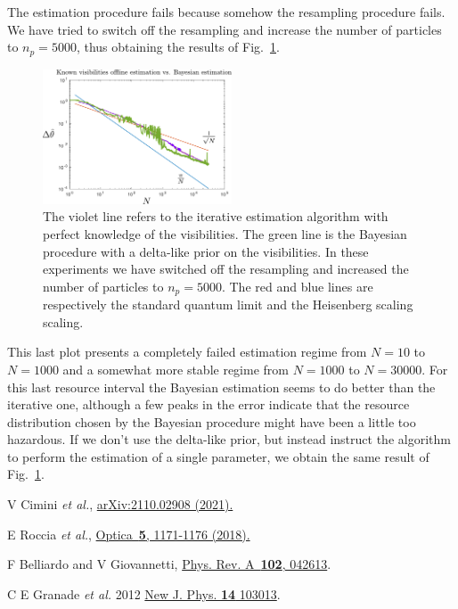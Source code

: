 \documentclass[aps, pra, 10pt, twocolumn, superscriptaddress,floatfix]{revtex4-1}
\begin{document}
%
The estimation procedure fails because somehow the resampling procedure fails. We have tried to switch off the resampling and increase the number of particles to $n_{p} = 5000$, thus obtaining the results of Fig.~\ref{fig:krz}.
%
\begin{figure}[!t]
	\begin{center}
		\includegraphics[width=0.5\textwidth]{bayesianNoResampling5000particles.pdf}
	\end{center}
	\caption{The violet line refers to the iterative estimation algorithm with perfect knowledge of the visibilities. The green line is the Bayesian procedure with a delta-like prior on the visibilities. In these experiments we have switched off the resampling and increased the number of particles to $n_p = 5000$. The red and blue lines are respectively the standard quantum limit and the Heisenberg scaling scaling.}
	\label{fig:krz}
\end{figure}
%
This last plot presents a completely failed estimation regime from $N=10$ to $N=1000$ and a somewhat more stable regime from $N = 1000$ to $N=30000$. For this last resource interval the Bayesian estimation seems to do better than the iterative one, although a few peaks in the error indicate that the resource distribution chosen by the Bayesian procedure might have been a little too hazardous. If we don't use the delta-like prior, but instead instruct the algorithm to perform the estimation of a single parameter, we obtain the same result of Fig.~\ref{fig:krz}.


\begin{thebibliography}{100}
			
	 V Cimini \textit{et al.}, \href{http://arxiv.org/abs/2110.02908}{arXiv:2110.02908 (2021).}
	
	 E Roccia \textit{et al.}, \href{https://www.osapublishing.org/optica/abstract.cfm?uri=optica-5-10-1171}{Optica~{\bf 5}, 1171-1176 (2018).}
		
	 F Belliardo and V Giovannetti, \href{https://link.aps.org/doi/10.1103/PhysRevA.102.042613}{Phys. Rev. A~{\bf 102}, 042613}.
	
	 C E Granade \textit{et al.} 2012 \href{https://doi.org/10.1088/1367-2630/14/10/103013}{New J. Phys. {\bf 14} 103013}.
	
\end{thebibliography}
\end{document}
